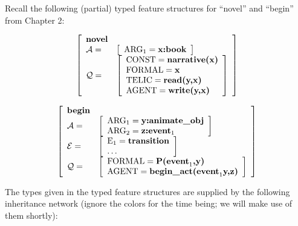 Recall the following (partial) typed feature structures for ``novel'' and ``begin'' from Chapter 2:
\par\vspace{5mm}
$$\left[
\begin{array}{l l}
\textbf{novel} & \\
\mathcal{A} = & \left[ \begin{array}{l}
				\text{ARG}_1=\textbf{x:book} \\
				\end{array}\right] \\
\mathcal{Q} = & \left[ \begin{array}{l}
				\text{CONST}=\textbf{narrative(x)} \\
				\text{FORMAL}=\textbf{x} \\
				\text{TELIC}=\textbf{read(y,x)} \\
				\text{AGENT}=\textbf{write(y,x)}
				\end{array}\right] \\
\end{array}
\right]$$
\par\vspace{5mm}
$$\left[
\begin{array}{l l}
\textbf{begin} & \\
\mathcal{A} = & \left[ \begin{array}{l}
	\text{ARG}_1=\textbf{y:animate\_obj} \\
	\text{ARG}_2=\textbf{z:event}_1 \\
	\end{array}\right] \\
\mathcal{E} = & \left[ \begin{array}{l}
	\text{E}_1=\textbf{transition} \\
	\mathellipsis \\
	\end{array}\right] \\
\mathcal{Q} = &  \left[ \begin{array}{l}
	\text{FORMAL}=\textbf{P(event}_1\textbf{,y)} \\
	\text{AGENT} = \textbf{begin\_act(event}_1\textbf{y,z)} \\
	\end{array}\right] \\
\end{array}
\right]$$
\par\vspace{5mm}
The types given in the typed feature structures are supplied by the following inheritance network (ignore the colors for the time being; we will make use of them shortly):
